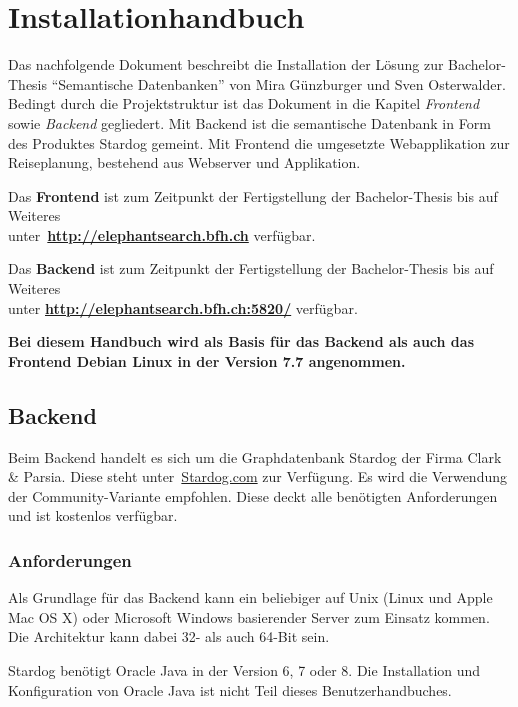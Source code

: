 \chapter{Installationhandbuch}
\label{chap:anhihb}
Das nachfolgende Dokument beschreibt die Installation der Lösung zur Bachelor-Thesis ``Semantische Datenbanken'' von Mira Günzburger und Sven Osterwalder. Bedingt durch die Projektstruktur ist das Dokument in die Kapitel \textit{Frontend} sowie \textit{Backend} gegliedert. Mit Backend ist die semantische Datenbank in Form des Produktes Stardog gemeint. Mit Frontend die umgesetzte Webapplikation zur Reiseplanung, bestehend aus Webserver und Applikation.

Das \textbf{Frontend} ist zum Zeitpunkt der Fertigstellung der Bachelor-Thesis bis auf Weiteres\\
unter~\href{http://elephantsearch.bfh.ch}{\textbf{http://elephantsearch.bfh.ch}} verfügbar.

Das \textbf{Backend} ist zum Zeitpunkt der Fertigstellung der Bachelor-Thesis bis auf Weiteres\\
unter \href{http://elephantsearch.bfh.ch:5820/}{\textbf{http://elephantsearch.bfh.ch:5820/}} verfügbar.

\textbf{Bei diesem Handbuch wird als Basis für das Backend als auch das Frontend Debian Linux in der Version 7.7 angenommen.}

\section{Backend}
\label{chap:anh:ihb:backend}
Beim Backend handelt es sich um die Graphdatenbank Stardog der Firma Clark \& Parsia. Diese steht unter~\href{http://www.stardog.com/\#download}{Stardog.com} zur Verfügung. Es wird die Verwendung der Community-Variante empfohlen. Diese deckt alle benötigten Anforderungen und ist kostenlos verfügbar.

\subsection{Anforderungen}
\label{chap:anh:ihb:backend:req}
Als Grundlage für das Backend kann ein beliebiger auf Unix (Linux und Apple Mac OS X) oder Microsoft Windows basierender Server zum Einsatz kommen. Die Architektur kann dabei 32- als auch 64-Bit sein.

Stardog benötigt Oracle Java in der Version 6, 7 oder 8.
Die Installation und Konfiguration von Oracle Java ist nicht Teil dieses Benutzerhandbuches.

